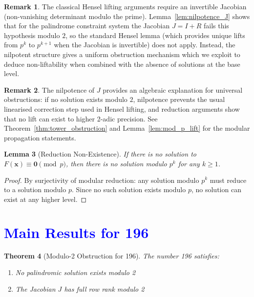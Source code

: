 \documentclass[11pt,a4paper]{article}
\theoremstyle{plain}
\newtheorem{theorem}{Theorem}[section]
\newtheorem{lemma}[theorem]{Lemma}
\theoremstyle{definition}
\newtheorem{remark}[theorem]{Remark}
\begin{document}
\begin{remark}
The classical Hensel lifting arguments require an invertible Jacobian (non-vanishing determinant modulo the prime). Lemma~\ref{lem:nilpotence_J} shows that for the palindrome constraint system the Jacobian $J=I+R$ fails this hypothesis modulo $2$, so the standard Hensel lemma (which provides unique lifts from $p^k$ to $p^{k+1}$ when the Jacobian is invertible) does not apply. Instead, the nilpotent structure gives a uniform obstruction mechanism which we exploit to deduce non-liftability when combined with the absence of solutions at the base level.
\end{remark}

\begin{remark}
The nilpotence of $J$ provides an algebraic explanation for universal obstructions: if no solution exists modulo $2$, nilpotence prevents the usual linearised correction step used in Hensel lifting, and reduction arguments show that no lift can exist to higher 2-adic precision. See Theorem~\ref{thm:tower_obstruction} and Lemma~\ref{lem:mod_p_lift} for the modular propagation statements.
\end{remark}

\begin{lemma}[Reduction Non-Existence]\label{lem:reduction}
If there is no solution to $F(\mathbf{x}) \equiv \mathbf{0} \pmod{p}$, then there is no solution modulo $p^k$ for any $k \geq 1$.
\end{lemma}

\begin{proof}
By surjectivity of modular reduction: any solution modulo $p^k$ must reduce to a solution modulo $p$. Since no such solution exists modulo $p$, no solution can exist at any higher level.
\end{proof}

\section{\textcolor{blue}{Main Results for 196}}

\begin{theorem}[Modulo-2 Obstruction for 196]\label{thm:mod2_196}
The number 196 satisfies:
\begin{enumerate}
\item No palindromic solution exists modulo 2
\item The Jacobian $J$ has full row rank modulo 2
\end{enumerate}
\end{theorem}
\end{document}
